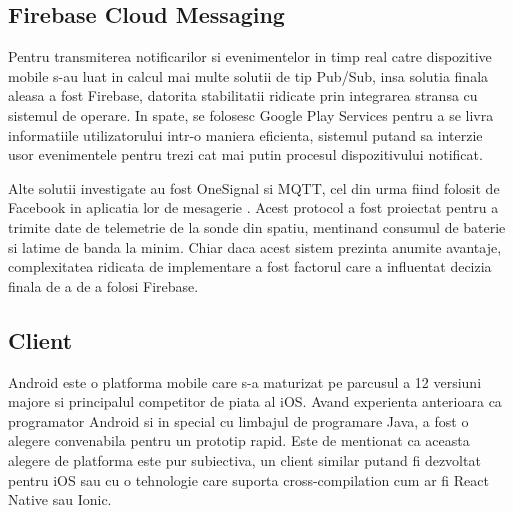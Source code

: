 \subsection {Firebase Cloud Messaging}

Pentru transmiterea notificarilor si evenimentelor in timp real catre dispozitive mobile s-au luat in calcul mai multe solutii de tip Pub/Sub, insa solutia finala aleasa a fost Firebase, datorita stabilitatii ridicate prin integrarea stransa cu sistemul de operare. In spate, se folosesc Google Play Services pentru a se livra informatiile utilizatorului intr-o maniera eficienta, sistemul putand sa interzie usor evenimentele pentru trezi cat mai putin procesul dispozitivului notificat.

Alte solutii investigate au fost OneSignal si MQTT, cel din urma fiind folosit de Facebook in aplicatia lor de mesagerie \cite{LucyZhang2021}. Acest protocol a fost proiectat pentru a trimite date de telemetrie de la sonde din spatiu, mentinand consumul de baterie si latime de banda la minim. Chiar daca acest sistem prezinta anumite avantaje, complexitatea ridicata de implementare a fost factorul care a influentat decizia finala de a de a folosi Firebase. 

\subsection {Client}

Android este o platforma mobile care s-a maturizat pe parcusul a 12 versiuni majore si principalul competitor de piata al iOS. Avand experienta anterioara ca programator Android si in special cu limbajul de programare Java, a fost o alegere convenabila pentru un prototip rapid.
Este de mentionat ca aceasta alegere de platforma este pur subiectiva, un client similar putand fi dezvoltat pentru iOS sau cu o tehnologie care suporta cross-compilation cum ar fi React Native sau Ionic.
